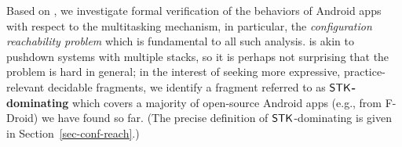 %

Based on {\AMASS}, we %
investigate formal verification of the behaviors of Android apps  with respect to the multitasking mechanism, %
in particular, the \emph{configuration reachability problem} which is fundamental to all such analysis. 
%
{\AMASS} is akin to pushdown systems with multiple stacks, so it is perhaps not surprising that the problem is hard in general; 
in the interest of seeking more expressive, practice-relevant decidable fragments, 
we identify a fragment referred to as \textbf{$\mathsf{STK}$-dominating {\AMASS}} 
which 
covers a majority of open-source Android apps (e.g., from F-Droid) we have found so far. (The precise definition of $\mathsf{STK}$-dominating {\AMASS} is given in Section~\ref{sec-conf-reach}.) 

